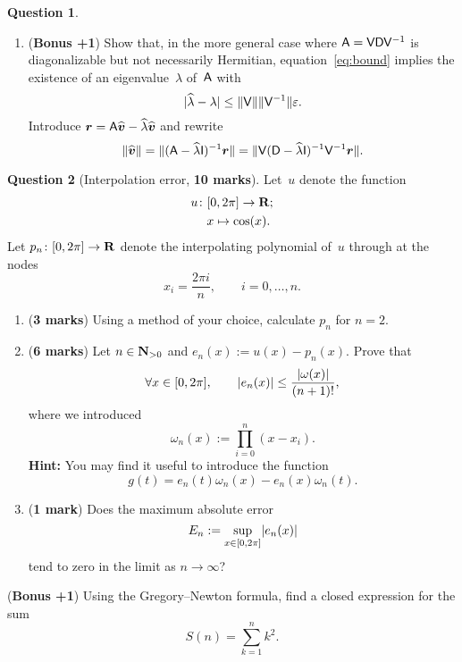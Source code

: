 \documentclass[11pt]{article}
\theoremstyle{definition}
\newtheorem{question}{Question}
\theoremstyle{remark}
\begin{document}
\begin{question}
\begin{enumerate}
        \item
            (\textbf{Bonus +1}) Show that, in the more general case where $\mathsf A = \mathsf V \mathsf D \mathsf V^{-1}$ is diagonalizable but not necessarily Hermitian,
            equation~\eqref{eq:bound} implies the existence of an eigenvalue~$\lambda$ of~$\mathsf A$ with
            \[
                \lvert\widehat \lambda - \lambda\rvert \leq \lVert\mathsf V\rVert \lVert\mathsf V^{-1}\rVert \varepsilon.
            \]
            Introduce $\mathbf{\boldsymbol{r}} = \mathsf A \widehat{\mathbf{\boldsymbol{v}}} - \widehat{\lambda} \widehat{\mathbf{\boldsymbol{v}}}$ and rewrite
            \[
                \lVert\widehat {\mathbf{\boldsymbol{v}}}\rVert = \lVert(\mathsf A - \widehat \lambda \mathsf I)^{-1}  {\mathbf{\boldsymbol{r}}}\rVert
                = \lVert\mathsf V (\mathsf D - \widehat \lambda \mathsf I)^{-1}  \mathsf V^{-1} {\mathbf{\boldsymbol{r}}}\rVert.
            \]
    \end{enumerate}
\end{question}

\newpage
\begin{question}
    [Interpolation error, \textbf{10 marks}]
    Let~$u$ denote the function
    \begin{align*}
        u\colon
        &[0, 2\pi] \to \mathbf R; \\
        &x \mapsto \cos(x).
    \end{align*}
    Let $p_n \colon [0, 2 \pi] \to \mathbf R$ denote the interpolating polynomial of~$u$ through at the nodes
    \[
        x_i = \frac{2 \pi i}{n}, \qquad i = 0, \dotsc, n.
    \]
    \begin{enumerate}
        \item
            (\textbf{3 marks})
            Using a method of your choice,
            calculate $p_n$ for $n = 2$.

        \item
            (\textbf{6 marks})
            Let $n \in \mathbf N_{>0}$ and $e_n(x) := u(x) - p_n(x)$.
            Prove that
            \[
                \forall x \in [0, 2\pi], \qquad
                \lvert e_n(x)\rvert
                \leq \frac{\lvert \omega(x) \rvert}{(n+1)!},
            \]
            where we introduced
            \[
                \omega_n(x) := \prod_{i=0}^{n} (x - x_i).
            \]
            \textbf{Hint:} You may find it useful to introduce the function
            \[
                g(t) = e_n(t) \omega_n(x) - e_n(x) \omega_n(t).
            \]

        \item
            (\textbf{1 mark}) Does the maximum absolute error
            \[
                E_n := \sup_{x \in [0, 2\pi]} \lvert e_n(x)\rvert
            \]
            tend to zero in the limit as $n \to \infty$?
    \end{enumerate}

    \noindent (\textbf{Bonus +1}) Using the Gregory--Newton formula,
    find a closed expression for the sum
    \[
        S(n) = \sum_{k=1}^{n} k^2.
    \]
\end{question}
\end{document}
